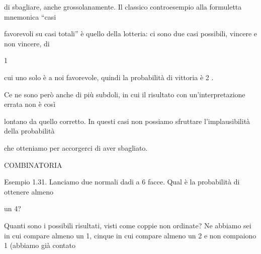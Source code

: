 \documentclass[a4paper,portrait,12pt]{article}
\begin{document}
\begin{flushleft}
di sbagliare, anche grossolanamente. Il classico controesempio alla formuletta mnemonica {``}casi
\end{flushleft}


\begin{flushleft}
favorevoli su casi totali'' \`{e} quello della lotteria: ci sono due casi possibili, vincere e non vincere, di
\end{flushleft}


1


\begin{flushleft}
cui uno solo \`{e} a noi favorevole, quindi la probabilit\`{a} di vittoria \`{e} 2 .
\end{flushleft}


\begin{flushleft}
Ce ne sono per\`{o} anche di più subdoli, in cui il risultato con un'interpretazione errata non \`{e} così
\end{flushleft}


\begin{flushleft}
lontano da quello corretto. In questi casi non possiamo sfruttare l'implausibilit\`{a} della probabilit\`{a}
\end{flushleft}


\begin{flushleft}
che otteniamo per accorgerci di aver sbagliato.
\end{flushleft}










\begin{flushleft}
COMBINATORIA
\end{flushleft}





\begin{flushleft}
Esempio 1.31. Lanciamo due normali dadi a 6 facce. Qual \`{e} la probabilit\`{a} di ottenere almeno
\end{flushleft}


\begin{flushleft}
un 4?
\end{flushleft}


\begin{flushleft}
Quanti sono i possibili risultati, visti come coppie non ordinate? Ne abbiamo sei in cui compare almeno un 1, cinque in cui compare almeno un 2 e non compaiono 1 (abbiamo gi\`{a} contato
\end{flushleft}
\end{document}
